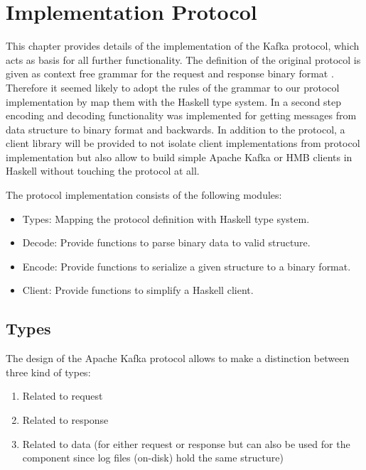 \chapter{Implementation Protocol} 
\label{sec-protocol} 

This chapter provides details of the implementation of the Kafka protocol, which
acts as basis for all further functionality. The definition of the original
protocol is given as context free grammar for the request and response binary
format \cite{kafka-protocol}. Therefore it seemed likely to adopt the rules of the grammar to our
protocol implementation by map them with the Haskell type system. In a second
step encoding and decoding functionality was implemented for getting messages
from data structure to binary format and backwards. In addition to the protocol,
a client library will be provided to not isolate client implementations from
protocol implementation but also allow to build simple Apache Kafka or HMB
clients in Haskell without touching the protocol at all.

The protocol implementation consists of the following modules: 
\begin{itemize}
    \item {Types: Mapping the protocol definition with Haskell type system. }
    \item {Decode: Provide functions to parse binary data to valid structure. }
    \item {Encode: Provide functions to serialize a given structure to a binary
        format. }
    \item {Client: Provide functions to simplify a Haskell client.}
\end{itemize}

\section{Types}

The design of the Apache Kafka protocol allows to make a distinction between
three kind of types:

\begin{enumerate}
  \item Related to request
  \item Related to response
  \item Related to data (for either request or response but can also be used for
      the  component since log
      files (on-disk) hold the same structure) 
\end{enumerate}

